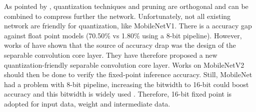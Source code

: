As pointed by \textcite{han_deep_2016}, quantization techniques and pruning are orthogonal and can be combined to compress further the network. Unfortunately, not all existing network are friendly for quantization, like MobileNetV1. There is a accuracy gap against float point models (70.50\% vs 1.80\% using a 8-bit pipeline). However, works of \textcite{sheng_quantization-friendly_2018} have shown that the source of accuracy drap was the design of the separable convolution core layer. They have therefore proposed a new quantization-friendly separable convolution core layer. Works on MobileNetV2 should then be done to verify the fixed-point inference accuracy. Still, MobileNet had a problem with 8-bit pipeline, increasing the bitwidth to 16-bit could boost accuracy \cite{cheng_recent_2018} and this bitwidth is widely used \cite{huimin_li_high_2016, bai_cnn_2018}. Therefore, 16-bit fixed point is adopted for input data, weight and intermediate data.
